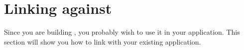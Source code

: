

%
% 

%
%




\section{Linking against \libflame}
\label{sec:linking}


Since you are building \libflamens, you probably wish to use it in your
application.
This section will show you how to link \libflame with your existing application.

